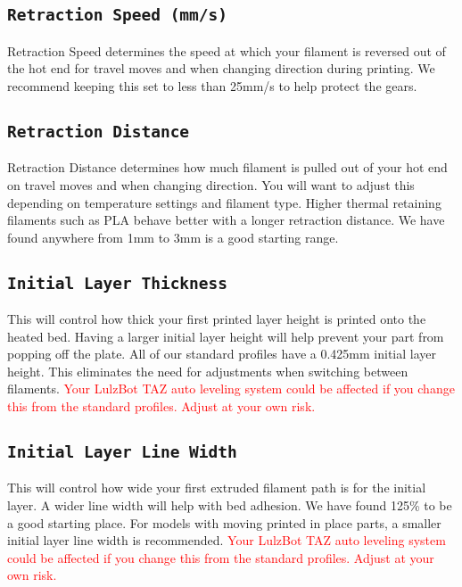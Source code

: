 \subsection{\texttt{Retraction Speed (mm/s)}}
Retraction Speed determines the speed at which your filament is reversed out of the hot end for travel moves and when changing direction during printing. We recommend keeping this set to less than 25mm/s to help protect the gears.

\subsection{\texttt{Retraction Distance}}
Retraction Distance determines how much filament is pulled out of your hot end on travel moves and when changing direction. You will want to adjust this depending on temperature settings and filament type. Higher thermal retaining filaments such as PLA behave better with a longer retraction distance. We have found anywhere from 1mm to 3mm is a good starting range.

\subsection{\texttt{Initial Layer Thickness}}
This will control how thick your first printed layer height is printed onto the heated bed. Having a larger initial layer height will help prevent your part from popping off the plate. All of our standard profiles have a 0.425mm initial layer height. This eliminates the need for adjustments when switching between filaments.  \textcolor{red}{Your LulzBot TAZ auto leveling system could be affected if you change this from the standard profiles. Adjust at your own risk.}
\subsection{\texttt{Initial Layer Line Width}}
This will control how wide your first extruded filament path is for the initial layer. A wider line width will help with bed adhesion. We have found 125\% to be a good starting place. For models with moving printed in place parts, a smaller initial layer line width is recommended. \textcolor{red}{Your LulzBot TAZ auto leveling system could be affected if you change this from the standard profiles. Adjust at your own risk.}

